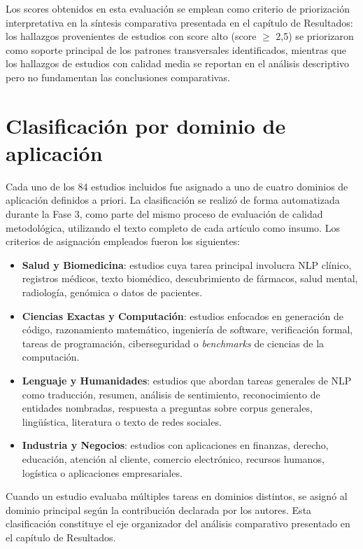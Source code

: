 Los scores obtenidos en esta evaluación se emplean como criterio de priorización interpretativa en la síntesis comparativa presentada en el capítulo de Resultados: los hallazgos provenientes de estudios con score alto (score $\geq$ 2,5) se priorizaron como soporte principal de los patrones transversales identificados, mientras que los hallazgos de estudios con calidad media se reportan en el análisis descriptivo pero no fundamentan las conclusiones comparativas.

\section{Clasificación por dominio de aplicación}

Cada uno de los 84 estudios incluidos fue asignado a uno de cuatro dominios de aplicación definidos a priori. La clasificación se realizó de forma automatizada durante la Fase 3, como parte del mismo proceso de evaluación de calidad metodológica, utilizando el texto completo de cada artículo como insumo. Los criterios de asignación empleados fueron los siguientes:

\begin{itemize}
    \item \textbf{Salud y Biomedicina}: estudios cuya tarea principal involucra NLP clínico, registros médicos, texto biomédico, descubrimiento de fármacos, salud mental, radiología, genómica o datos de pacientes.
    \item \textbf{Ciencias Exactas y Computación}: estudios enfocados en generación de código, razonamiento matemático, ingeniería de software, verificación formal, tareas de programación, ciberseguridad o \textit{benchmarks} de ciencias de la computación.
    \item \textbf{Lenguaje y Humanidades}: estudios que abordan tareas generales de NLP como traducción, resumen, análisis de sentimiento, reconocimiento de entidades nombradas, respuesta a preguntas sobre corpus generales, lingüística, literatura o texto de redes sociales.
    \item \textbf{Industria y Negocios}: estudios con aplicaciones en finanzas, derecho, educación, atención al cliente, comercio electrónico, recursos humanos, logística o aplicaciones empresariales.
\end{itemize}

Cuando un estudio evaluaba múltiples tareas en dominios distintos, se asignó al dominio principal según la contribución declarada por los autores. Esta clasificación constituye el eje organizador del análisis comparativo presentado en el capítulo de Resultados.

